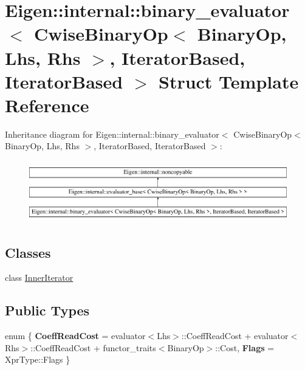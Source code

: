 \hypertarget{struct_eigen_1_1internal_1_1binary__evaluator_3_01_cwise_binary_op_3_01_binary_op_00_01_lhs_00_05c4f9212bd4fb2e2b8664dee5123f03b}{}\section{Eigen\+::internal\+::binary\+\_\+evaluator$<$ Cwise\+Binary\+Op$<$ Binary\+Op, Lhs, Rhs $>$, Iterator\+Based, Iterator\+Based $>$ Struct Template Reference}
\label{struct_eigen_1_1internal_1_1binary__evaluator_3_01_cwise_binary_op_3_01_binary_op_00_01_lhs_00_05c4f9212bd4fb2e2b8664dee5123f03b}
Inheritance diagram for Eigen\+::internal\+::binary\+\_\+evaluator$<$ Cwise\+Binary\+Op$<$ Binary\+Op, Lhs, Rhs $>$, Iterator\+Based, Iterator\+Based $>$\+:\begin{figure}[H]
\begin{center}
\leavevmode
\includegraphics[height=2.714055cm]{struct_eigen_1_1internal_1_1binary__evaluator_3_01_cwise_binary_op_3_01_binary_op_00_01_lhs_00_05c4f9212bd4fb2e2b8664dee5123f03b}
\end{center}
\end{figure}
\subsection*{Classes}
\begin{DoxyCompactItemize}
\item 
class \mbox{\hyperlink{class_eigen_1_1internal_1_1binary__evaluator_3_01_cwise_binary_op_3_01_binary_op_00_01_lhs_00_01bbcbab6e07c6c8a44f9c2134b78b5906}{Inner\+Iterator}}
\end{DoxyCompactItemize}
\subsection*{Public Types}
\begin{DoxyCompactItemize}
\item 
\mbox{\label{struct_eigen_1_1internal_1_1binary__evaluator_3_01_cwise_binary_op_3_01_binary_op_00_01_lhs_00_05c4f9212bd4fb2e2b8664dee5123f03b_abb322ac291440bb57c738867b3688322}} 
enum \{ {\bfseries Coeff\+Read\+Cost} = evaluator$<$Lhs$>$\+::Coeff\+Read\+Cost + evaluator$<$Rhs$>$\+::Coeff\+Read\+Cost + functor\+\_\+traits$<$Binary\+Op$>$\+::Cost, 
{\bfseries Flags} = Xpr\+Type\+::Flags
 \}
\end{DoxyCompactItemize}
